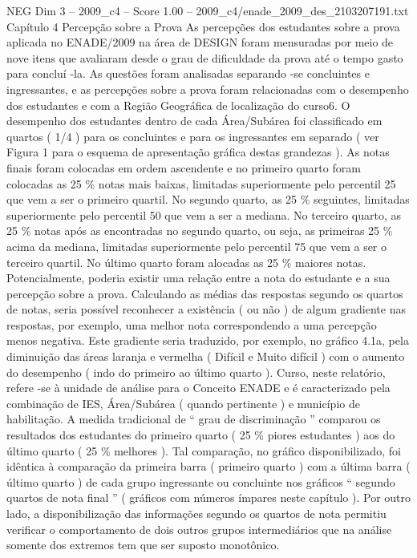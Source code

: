 \begin{textsample}{NEG Dim 3 – 2009\_c4 – Score 1.00 – 2009\_c4/enade\_2009\_des\_2103207191.txt}  \label{ex:f3_neg_156}
Capítulo 4 Percepção sobre a Prova As percepções dos estudantes sobre a prova aplicada no ENADE/2009 na área de DESIGN foram mensuradas por meio de nove itens que avaliaram desde o grau de dificuldade da prova até o tempo gasto para concluí -la.
As questões foram analisadas separando -se concluintes e ingressantes, e as percepções sobre a prova foram relacionadas com o desempenho dos estudantes e com a Região Geográfica de localização do curso6.
O desempenho dos estudantes dentro de cada Área/Subárea foi classificado em quartos ( 1/4 ) para os concluintes e para os ingressantes em separado ( ver Figura 1 para o esquema de apresentação gráfica destas grandezas ).
As notas finais foram colocadas em ordem ascendente e no primeiro quarto foram colocadas as 25 \% notas mais baixas, limitadas superiormente pelo percentil 25 que vem a ser o primeiro quartil.
No segundo quarto, as 25 \% seguintes, limitadas superiormente pelo percentil 50 que vem a ser a mediana.
No terceiro quarto, as 25 \% notas após as encontradas no segundo quarto, ou seja, as primeiras 25 \% acima da mediana, limitadas superiormente pelo percentil 75 que vem a ser o terceiro quartil.
No último quarto foram alocadas as 25 \% maiores notas.
Potencialmente, poderia existir uma relação entre a nota do estudante e a sua percepção sobre a prova.
Calculando as médias das respostas segundo os quartos de notas, seria possível reconhecer a existência ( ou não ) de algum gradiente nas respostas, por exemplo, uma melhor nota correspondendo a uma percepção menos negativa.
Este gradiente seria traduzido, por exemplo, no gráfico 4.1a, pela diminuição das áreas laranja e vermelha ( Difícil e Muito difícil ) com o aumento do desempenho ( indo do primeiro ao último quarto ).
Curso, neste relatório, refere -se à unidade de análise para o Conceito ENADE e é caracterizado pela combinação de IES, Área/Subárea ( quando pertinente ) e município de habilitação.
A medida tradicional de “ grau de discriminação ” comparou os resultados dos estudantes do primeiro quarto ( 25 \% piores estudantes ) aos do último quarto ( 25 \% melhores ).
Tal comparação, no gráfico disponibilizado, foi idêntica à comparação da primeira barra ( primeiro quarto ) com a última barra ( último quarto ) de cada grupo ingressante ou concluinte nos gráficos “ segundo quartos de nota final ” ( gráficos com números ímpares neste capítulo ).
Por outro lado, a disponibilização das informações segundo os quartos de nota permitiu verificar o comportamento de dois outros grupos intermediários que na análise somente dos extremos tem que ser suposto monotônico.

\end{textsample}

